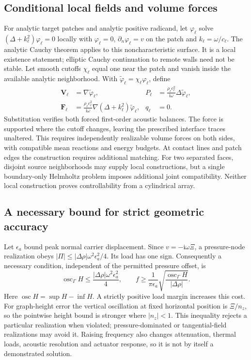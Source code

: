 \subsection{Conditional local fields and volume forces}
For analytic target patches and analytic positive radicand, let
$\varphi_\ell$ solve $(\Delta+k_\ell^2)\varphi_\ell=0$ locally with
$\varphi_\ell=0$, $\partial_n\varphi_\ell=v$ on the patch and
$k_\ell=\omega/c_\ell$. The analytic Cauchy theorem \cite{kowalevsky1875} applies to this
noncharacteristic surface. It is a local existence statement; elliptic Cauchy
continuation to remote walls need not be stable. Let smooth cutoffs $\chi_\ell$
equal one near the patch and vanish inside the available analytic neighborhood.
With $\widetilde\varphi_\ell=\chi_\ell\varphi_\ell$, define
\begin{align}
 \bm V_\ell&=\nabla\widetilde\varphi_\ell,&
 P_\ell&=\frac{\rho_\ell c_\ell^2}{\mathrm i\omega}
                              \Delta\widetilde\varphi_\ell,\\
 \bm F_\ell&=\frac{\rho_\ell c_\ell^2}{\mathrm i\omega}
                   \nabla(\Delta+k_\ell^2)\widetilde\varphi_\ell,&q_\ell&=0.
 \label{eq:cutoff-volume-force}
\end{align}
Substitution verifies both forced first-order acoustic balances. The force is
supported where the cutoff changes, leaving the prescribed interface traces
unaltered. This requires independently realizable volume forces on both sides,
with compatible mean reactions and energy budgets. At contact lines and patch
edges the construction requires additional matching. For two separated faces,
disjoint source neighborhoods may supply local constructions, but a single
boundary-only Helmholtz problem imposes additional joint compatibility.
Neither local construction proves controllability from a cylindrical array.

\subsection{A necessary bound for strict geometric accuracy}
Let $\epsilon_a$ bound peak normal carrier displacement. Since
$v=-\mathrm i\omega\Xi$, a pressure-node realization obeys
$|\Pi|\leq |\Delta\rho|\omega^2\epsilon_a^2/4$.
Its load has one sign. Consequently a necessary condition, independent of the
permitted pressure offset, is
\begin{equation}
 \operatorname{osc}_{\Gamma}H
 \leq\frac{|\Delta\rho|\omega^2\epsilon_a^2}{4},\qquad
 f\geq\frac{1}{\pi\epsilon_a}
            \sqrt{\frac{\operatorname{osc}_{\Gamma}H}{|\Delta\rho|}}.
 \label{eq:pressure-node-displacement-bound}
\end{equation}
Here $\operatorname{osc}H=\sup H-\inf H$. A strictly positive load margin
increases this cost. For graph-height error the vertical oscillation at fixed
horizontal position is $\Xi/n_z$, so the pointwise height bound is stronger
where $|n_z|<1$. This inequality rejects a particular realization when violated;
pressure-dominated or tangential-field realizations may avoid it. Raising
frequency also changes attenuation, thermal loads, acoustic resolution and
actuator response, so it is not by itself a demonstrated solution.

